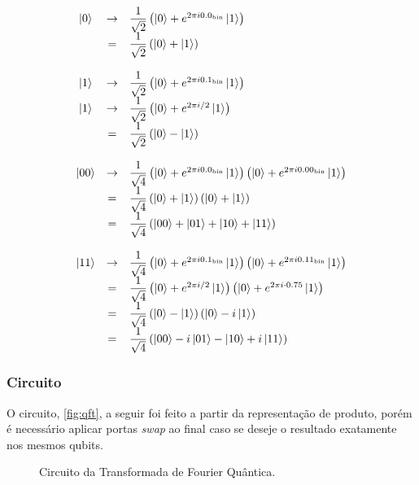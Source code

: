 \[
    \begin{array}{ccl}
        \ket{0} &\to& \dfrac{1}{\sqrt{2}} \left( \ket{0} + e^{2\pi i0.0_{\text{bin}}} \ket{1} \right) \\
        &=& \dfrac{1}{\sqrt{2}} \left( \ket{0} + \ket{1} \right) \\ \\
        \ket{1} &\to& \dfrac{1}{\sqrt{2}} \left( \ket{0} + e^{2\pi i0.1_{\text{bin}}} \ket{1} \right) \\
        \ket{1} &\to& \dfrac{1}{\sqrt{2}} \left( \ket{0} + e^{2\pi i/2} \ket{1} \right) \\
        &=& \dfrac{1}{\sqrt{2}} \left( \ket{0} - \ket{1} \right) \\ \\
        \ket{00} &\to& \dfrac{1}{\sqrt{4}} \left( \ket{0} + e^{2\pi i0.0_{\text{bin}}} \ket{1} \right) \left( \ket{0} + e^{2\pi i0.00_{\text{bin}}} \ket{1} \right) \\
        &=& \dfrac{1}{\sqrt{4}} \left( \ket{0} + \ket{1} \right) \left( \ket{0} + \ket{1} \right) \\
        &=& \dfrac{1}{\sqrt{4}} \left( \ket{00} + \ket{01} + \ket{10} + \ket{11} \right) \\ \\
        \ket{11} &\to& \dfrac{1}{\sqrt{4}} \left( \ket{0} + e^{2\pi i0.1_{\text{bin}}} \ket{1} \right) \left( \ket{0} + e^{2\pi i0.11_{\text{bin}}} \ket{1} \right) \\
        &=& \dfrac{1}{\sqrt{4}} \left( \ket{0} + e^{2\pi i/2} \ket{1} \right) \left( \ket{0} + e^{2\pi i\cdot 0.75} \ket{1} \right) \\
        &=& \dfrac{1}{\sqrt{4}} \left( \ket{0} - \ket{1} \right) \left( \ket{0} - i\ket{1} \right) \\
        &=& \dfrac{1}{\sqrt{4}} \left( \ket{00} - i\ket{01} - \ket{10} + i\ket{11} \right)
    \end{array}
\]

\subsubsection{Circuito}\label{subsubsec:circuito}

O circuito, \autoref{fig:qft}, a seguir foi feito a partir da representação de produto,
porém é necessário aplicar portas \textit{swap} ao final caso se deseje o
resultado exatamente nos mesmos qubits.

\begin{figure}[!htb]
    \centering
    
    \caption{Circuito da Transformada de Fourier Quântica.}
    \label{fig:qft}
\end{figure}


